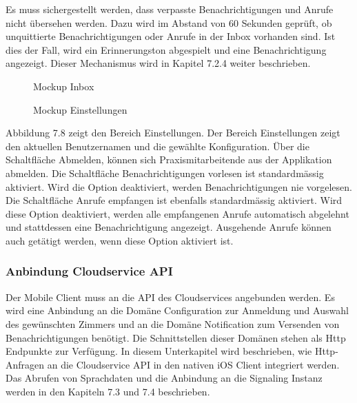 Es muss sichergestellt werden, dass verpasste Benachrichtigungen und Anrufe nicht übersehen werden.
Dazu wird im Abstand von 60 Sekunden geprüft, ob unquittierte Benachrichtigungen oder Anrufe in der Inbox vorhanden sind.
Ist dies der Fall, wird ein Erinnerungston abgespielt und eine Benachrichtigung angezeigt.
Dieser Mechanismus wird in Kapitel 7.2.4 weiter beschrieben.

\begin{figure}[h]
    \centering
    \begin{minipage}[b]{0.4\textwidth}
        \caption{Mockup Inbox}
    \end{minipage}
    \hfill
    \begin{minipage}[b]{0.4\textwidth}
        \caption{Mockup Einstellungen}
    \end{minipage}\label{fig:Mockups-Inbox-Settings}
\end{figure}

Abbildung 7.8 zeigt den Bereich Einstellungen.
Der Bereich Einstellungen zeigt den aktuellen Benutzernamen und die gewählte Konfiguration.
Über die Schaltfläche Abmelden, können sich Praxismitarbeitende aus der Applikation abmelden.
Die Schaltfläche Benachrichtigungen vorlesen ist standardmässig aktiviert.
Wird die Option deaktiviert, werden Benachrichtigungen nie vorgelesen.
Die Schaltfläche Anrufe empfangen ist ebenfalls standardmässig aktiviert.
Wird diese Option deaktiviert, werden alle empfangenen Anrufe automatisch abgelehnt und stattdessen eine Benachrichtigung angezeigt.
Ausgehende Anrufe können auch getätigt werden, wenn diese Option aktiviert ist.

\subsubsection{Anbindung Cloudservice API}

Der Mobile Client muss an die API des Cloudservices angebunden werden.
Es wird eine Anbindung an die Domäne Configuration zur Anmeldung und Auswahl des gewünschten Zimmers und an die Domäne Notification zum Versenden von Benachrichtigungen benötigt.
Die Schnittstellen dieser Domänen stehen als Http Endpunkte zur Verfügung.
In diesem Unterkapitel wird beschrieben, wie Http-Anfragen an die Cloudservice API in den nativen iOS Client integriert werden.
Das Abrufen von Sprachdaten und die Anbindung an die Signaling Instanz werden in den Kapiteln 7.3 und 7.4 beschrieben.

